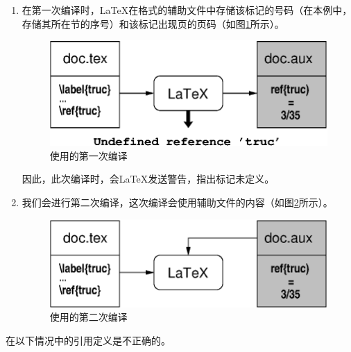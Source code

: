 \begin{enumerate}
  \item 在第一次编译时，\LaTeX 在格式的辅助文件中存储该标记的号码（在本例中，存储其所在节的序号）和该标记出现页的页码（如图\ref{fig:ref1}所示）。
  
  \begin{figure}[ht]
    \begin{center}
      \includegraphics{img/ref1.eps}
    \end{center}
    \caption{使用的第一次编译}
    \label{fig:ref1}
  \end{figure}

  因此，此次编译时，会\LaTeX 发送警告，指出标记未定义。
  \item 我们会进行第二次编译，这次编译会使用辅助文件的内容（如图\ref{fig:ref2}所示）。
  
  \begin{figure}[ht]
    \begin{center}
      \includegraphics{img/ref2.eps}
    \end{center}
    \caption{使用的第二次编译}
    \label{fig:ref2}
  \end{figure}
\end{enumerate}

在以下情况中的引用定义是不正确的。

